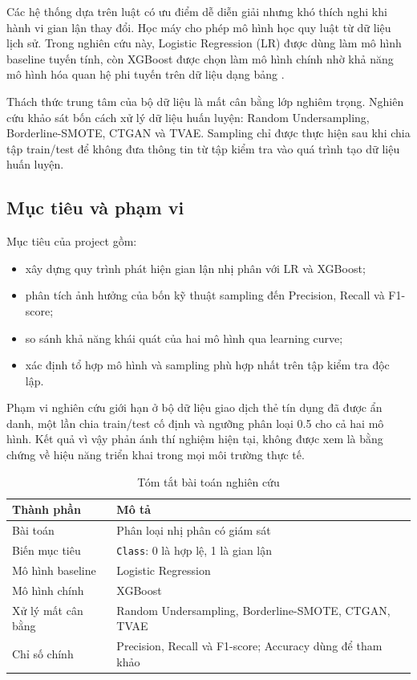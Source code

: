 \documentclass[12pt,a4paper]{article}
\begin{document}
Các hệ thống dựa trên luật có ưu điểm dễ diễn giải nhưng khó thích nghi khi hành vi gian lận thay đổi. Học máy cho phép mô hình học quy luật từ dữ liệu lịch sử. Trong nghiên cứu này, Logistic Regression (LR) được dùng làm mô hình baseline tuyến tính, còn XGBoost được chọn làm mô hình chính nhờ khả năng mô hình hóa quan hệ phi tuyến trên dữ liệu dạng bảng \cite{chen2016}.

Thách thức trung tâm của bộ dữ liệu là mất cân bằng lớp nghiêm trọng. Nghiên cứu khảo sát bốn cách xử lý dữ liệu huấn luyện: Random Undersampling, Borderline-SMOTE, CTGAN và TVAE. Sampling chỉ được thực hiện sau khi chia tập train/test để không đưa thông tin từ tập kiểm tra vào quá trình tạo dữ liệu huấn luyện.

\subsection{Mục tiêu và phạm vi}

Mục tiêu của project gồm:
\begin{itemize}
    \item xây dựng quy trình phát hiện gian lận nhị phân với LR và XGBoost;
    \item phân tích ảnh hưởng của bốn kỹ thuật sampling đến Precision, Recall và F1-score;
    \item so sánh khả năng khái quát của hai mô hình qua learning curve;
    \item xác định tổ hợp mô hình và sampling phù hợp nhất trên tập kiểm tra độc lập.
\end{itemize}

Phạm vi nghiên cứu giới hạn ở bộ dữ liệu giao dịch thẻ tín dụng đã được ẩn danh, một lần chia train/test cố định và ngưỡng phân loại 0.5 cho cả hai mô hình. Kết quả vì vậy phản ánh thí nghiệm hiện tại, không được xem là bằng chứng về hiệu năng triển khai trong mọi môi trường thực tế.

\begin{table}[H]
    \centering
    \begin{tabular}{p{4.1cm}p{10.1cm}}
        \toprule
        \textbf{Thành phần} & \textbf{Mô tả} \\
        \midrule
        Bài toán & Phân loại nhị phân có giám sát \\
        Biến mục tiêu & \texttt{Class}: 0 là hợp lệ, 1 là gian lận \\
        Mô hình baseline & Logistic Regression \\
        Mô hình chính & XGBoost \\
        Xử lý mất cân bằng & Random Undersampling, Borderline-SMOTE, CTGAN, TVAE \\
        Chỉ số chính & Precision, Recall và F1-score; Accuracy dùng để tham khảo \\
        \bottomrule
    \end{tabular}
    \caption{Tóm tắt bài toán nghiên cứu}
    \label{tab:problem-summary}
\end{table}
\end{document}
